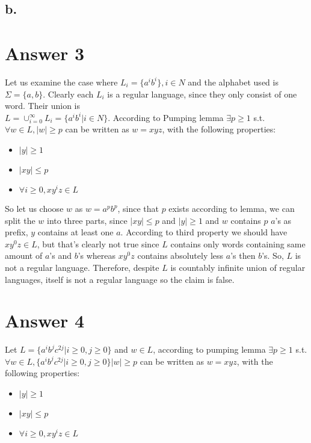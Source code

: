 \documentclass[12pt]{article}
\begin{document}
\subsection*{b.}

\section*{Answer 3}
Let us examine the case where $L_i=\{a^ib^i\}, i\in N$ and the alphabet used is $\Sigma = \{a,b\}$.
Clearly each $L_i$ is a regular language, since they only consist of one word. Their union is \\
$L=\cup_{i=0}^{\infty}L_i=\{a^ib^i|i\in N\}$. According to Pumping lemma $\exists p \ge 1$ s.t. 
$\forall w\in L, |w|\ge p$ can be written as $w=xyz$, with the following properties:

\def\labelitemi{-}
\begin{itemize}
	\item $|y|\ge 1$
	\item $|xy|\le p$
	\item $\forall i\ge 0, xy^iz\in L$
\end{itemize}

So let us choose $w$ as $w=a^pb^p$, since that $p$ exists according to lemma, we can split the $w$
into three parts, since $|xy|\le p$ and $|y|\ge 1$ and $w$ contains $p$ $a$'s as prefix, $y$
contains at least one $a$. According to third property we should have $xy^0z\in L$, but that's
clearly not true since $L$ contains only words containing same amount of $a$'s and $b$'s whereas $xy^0z$
contains absolutely less $a$'s then $b$'s. So, $L$ is not a regular language. Therefore, despite
$L$ is countably infinite union of regular languages, itself is not a regular language so the claim
is false.



\section*{Answer 4}
Let $L=\{a^ib^jc^{2j} | i\ge 0,j\ge 0\}$ and $w\in L$, according to pumping lemma $\exists p\ge 1$ s.t.\\
$\forall w\in L,\{a^ib^jc^{2j} | i\ge 0,j\ge 0\} |w|\ge p$ can be written as $w=xyz$, with the 
following properties:
\def\labelitemi{-}
\begin{itemize}
	\item $|y|\ge 1$
	\item $|xy|\le p$
	\item $\forall i\ge 0, xy^iz\in L$
\end{itemize}
\end{document}
